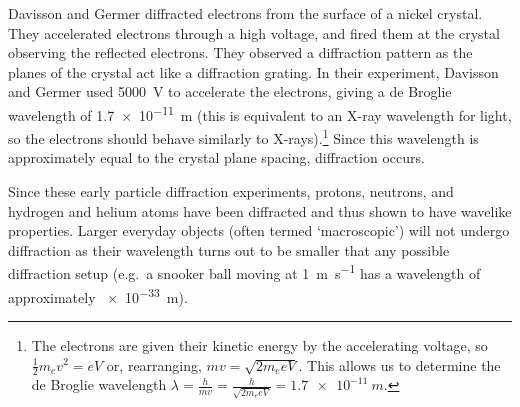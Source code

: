 Davisson and Germer diffracted electrons from the surface of a nickel crystal.  They accelerated electrons through a high voltage, and fired them at the crystal observing the reflected electrons. They observed a diffraction pattern as the planes of the crystal act like a diffraction grating.  In their experiment, Davisson and Germer used \SI{5000}{V} to accelerate the electrons, giving a de Broglie wavelength of \SI{1.7e-11}{m} (this is equivalent to an X-ray wavelength for light, so the electrons should behave similarly to X-rays).\footnote{The electrons are given their kinetic energy by the accelerating voltage, so $\frac{1}{2}m_{e}v^{2}=eV$ or, rearranging, $mv=\sqrt{2m_{e}eV}$.  This allows us to determine the de Broglie wavelength $\lambda=\frac{h}{mv}=\frac{h}{\sqrt{2m_{e}eV}}=\SI{1.7e-11}{m}$.}  Since this wavelength is approximately equal to the crystal plane spacing, diffraction occurs.

Since these early particle diffraction experiments, protons, neutrons, and hydrogen and helium atoms have been diffracted and thus shown to have wavelike properties.  Larger everyday objects (often termed `macroscopic') will not undergo diffraction as their wavelength turns out to be smaller that any possible diffraction setup (e.g.\ a snooker ball moving at \SI{1}{m.s^{-1}} has a wavelength of approximately \SI{e-33}{m}).






